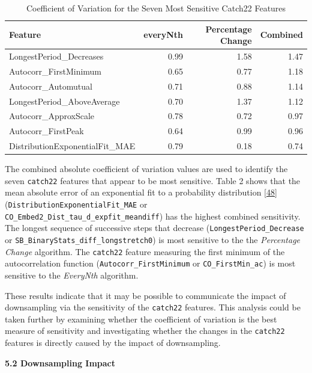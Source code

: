 \documentclass{article}
\begin{document}
\vspace{-0.2cm}

\begin{table}[H]

\caption{\label{tab:unnamed-chunk-2}Coefficient of Variation for the Seven Most Sensitive Catch22 Features}
\centering
\begin{tabular}[t]{l|r|r|r}
\hline
Feature & everyNth & Percentage Change & Combined\\
\hline
LongestPeriod\_Decreases & 0.99 & 1.58 & 1.47\\
\hline
Autocorr\_FirstMinimum & 0.65 & 0.77 & 1.18\\
\hline
Autocorr\_Automutual & 0.71 & 0.88 & 1.14\\
\hline
LongestPeriod\_AboveAverage & 0.70 & 1.37 & 1.12\\
\hline
Autocorr\_ApproxScale & 0.78 & 0.72 & 0.97\\
\hline
Autocorr\_FirstPeak & 0.64 & 0.99 & 0.96\\
\hline
DistributionExponentialFit\_MAE & 0.79 & 0.18 & 0.74\\
\hline
\end{tabular}
\end{table}

The combined absolute coefficient of variation values are used to
identify the seven \texttt{catch22} features that appear to be most
sensitive. Table 2 shows that the mean absolute error of an exponential
fit to a probability distribution
\protect\hyperlink{ref-feature_book}{{[}48{]}}
(\texttt{DistributionExponentialFit\_MAE} or
\texttt{CO\_Embed2\_Dist\_tau\_d\_expfit\_meandiff}) has the highest
combined sensitivity. The longest sequence of successive steps that
decrease (\texttt{LongestPeriod\_Decrease} or
\texttt{SB\_BinaryStats\_diff\_longstretch0}) is most sensitive to the
the \emph{Percentage Change} algorithm. The \texttt{catch22} feature
measuring the first minimum of the autocorrelation function
(\texttt{Autocorr\_FirstMinimum} or \texttt{CO\_FirstMin\_ac}) is most
sensitive to the \emph{EveryNth} algorithm.

These results indicate that it may be possible to communicate the impact
of downsampling via the sensitivity of the \texttt{catch22} features.
This analysis could be taken further by examining whether the
coefficient of variation is the best measure of sensitivity and
investigating whether the changes in the \texttt{catch22} features is
directly caused by the impact of downsampling.

\textbf{5.2 Downsampling Impact}
\end{document}
